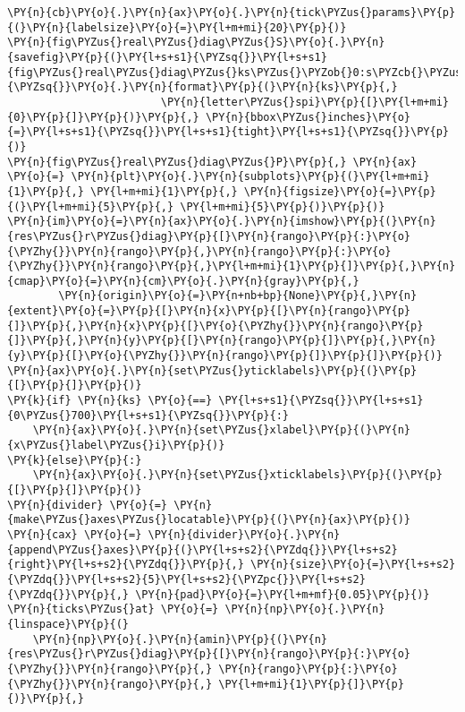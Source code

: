 \begin{Verbatim}[commandchars=\\\{\}]
\PY{n}{cb}\PY{o}{.}\PY{n}{ax}\PY{o}{.}\PY{n}{tick\PYZus{}params}\PY{p}{(}\PY{n}{labelsize}\PY{o}{=}\PY{l+m+mi}{20}\PY{p}{)}
\PY{n}{fig\PYZus{}real\PYZus{}diag\PYZus{}S}\PY{o}{.}\PY{n}{savefig}\PY{p}{(}\PY{l+s+s1}{\PYZsq{}}\PY{l+s+s1}{fig\PYZus{}real\PYZus{}diag\PYZus{}ks\PYZus{}\PYZob{}0:s\PYZcb{}\PYZus{}\PYZob{}1:s\PYZcb{}}\PY{l+s+s1}{\PYZsq{}}\PY{o}{.}\PY{n}{format}\PY{p}{(}\PY{n}{ks}\PY{p}{,}
                        \PY{n}{letter\PYZus{}spi}\PY{p}{[}\PY{l+m+mi}{0}\PY{p}{]}\PY{p}{)}\PY{p}{,} \PY{n}{bbox\PYZus{}inches}\PY{o}{=}\PY{l+s+s1}{\PYZsq{}}\PY{l+s+s1}{tight}\PY{l+s+s1}{\PYZsq{}}\PY{p}{)}
\PY{n}{fig\PYZus{}real\PYZus{}diag\PYZus{}P}\PY{p}{,} \PY{n}{ax} \PY{o}{=} \PY{n}{plt}\PY{o}{.}\PY{n}{subplots}\PY{p}{(}\PY{l+m+mi}{1}\PY{p}{,} \PY{l+m+mi}{1}\PY{p}{,} \PY{n}{figsize}\PY{o}{=}\PY{p}{(}\PY{l+m+mi}{5}\PY{p}{,} \PY{l+m+mi}{5}\PY{p}{)}\PY{p}{)}
\PY{n}{im}\PY{o}{=}\PY{n}{ax}\PY{o}{.}\PY{n}{imshow}\PY{p}{(}\PY{n}{res\PYZus{}r\PYZus{}diag}\PY{p}{[}\PY{n}{rango}\PY{p}{:}\PY{o}{\PYZhy{}}\PY{n}{rango}\PY{p}{,}\PY{n}{rango}\PY{p}{:}\PY{o}{\PYZhy{}}\PY{n}{rango}\PY{p}{,}\PY{l+m+mi}{1}\PY{p}{]}\PY{p}{,}\PY{n}{cmap}\PY{o}{=}\PY{n}{cm}\PY{o}{.}\PY{n}{gray}\PY{p}{,}
        \PY{n}{origin}\PY{o}{=}\PY{n+nb+bp}{None}\PY{p}{,}\PY{n}{extent}\PY{o}{=}\PY{p}{[}\PY{n}{x}\PY{p}{[}\PY{n}{rango}\PY{p}{]}\PY{p}{,}\PY{n}{x}\PY{p}{[}\PY{o}{\PYZhy{}}\PY{n}{rango}\PY{p}{]}\PY{p}{,}\PY{n}{y}\PY{p}{[}\PY{n}{rango}\PY{p}{]}\PY{p}{,}\PY{n}{y}\PY{p}{[}\PY{o}{\PYZhy{}}\PY{n}{rango}\PY{p}{]}\PY{p}{]}\PY{p}{)}
\PY{n}{ax}\PY{o}{.}\PY{n}{set\PYZus{}yticklabels}\PY{p}{(}\PY{p}{[}\PY{p}{]}\PY{p}{)}
\PY{k}{if} \PY{n}{ks} \PY{o}{==} \PY{l+s+s1}{\PYZsq{}}\PY{l+s+s1}{0\PYZus{}700}\PY{l+s+s1}{\PYZsq{}}\PY{p}{:}
    \PY{n}{ax}\PY{o}{.}\PY{n}{set\PYZus{}xlabel}\PY{p}{(}\PY{n}{x\PYZus{}label\PYZus{}i}\PY{p}{)}
\PY{k}{else}\PY{p}{:}
    \PY{n}{ax}\PY{o}{.}\PY{n}{set\PYZus{}xticklabels}\PY{p}{(}\PY{p}{[}\PY{p}{]}\PY{p}{)}
\PY{n}{divider} \PY{o}{=} \PY{n}{make\PYZus{}axes\PYZus{}locatable}\PY{p}{(}\PY{n}{ax}\PY{p}{)}
\PY{n}{cax} \PY{o}{=} \PY{n}{divider}\PY{o}{.}\PY{n}{append\PYZus{}axes}\PY{p}{(}\PY{l+s+s2}{\PYZdq{}}\PY{l+s+s2}{right}\PY{l+s+s2}{\PYZdq{}}\PY{p}{,} \PY{n}{size}\PY{o}{=}\PY{l+s+s2}{\PYZdq{}}\PY{l+s+s2}{5}\PY{l+s+s2}{\PYZpc{}}\PY{l+s+s2}{\PYZdq{}}\PY{p}{,} \PY{n}{pad}\PY{o}{=}\PY{l+m+mf}{0.05}\PY{p}{)}
\PY{n}{ticks\PYZus{}at} \PY{o}{=} \PY{n}{np}\PY{o}{.}\PY{n}{linspace}\PY{p}{(}
    \PY{n}{np}\PY{o}{.}\PY{n}{amin}\PY{p}{(}\PY{n}{res\PYZus{}r\PYZus{}diag}\PY{p}{[}\PY{n}{rango}\PY{p}{:}\PY{o}{\PYZhy{}}\PY{n}{rango}\PY{p}{,} \PY{n}{rango}\PY{p}{:}\PY{o}{\PYZhy{}}\PY{n}{rango}\PY{p}{,} \PY{l+m+mi}{1}\PY{p}{]}\PY{p}{)}\PY{p}{,}

\end{Verbatim}
